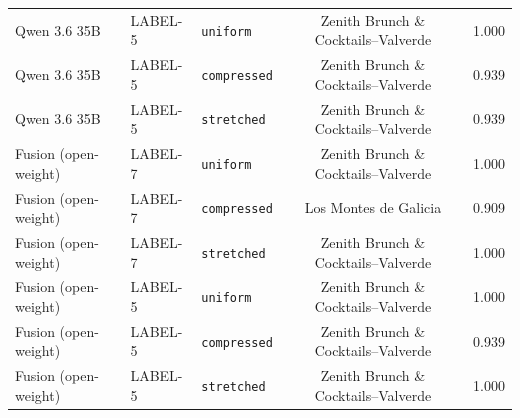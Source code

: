 \begin{table}[htbp]
{\begin{tabular}{lllcc}
  Qwen 3.6 35B & LABEL-5 & \texttt{uniform} & Zenith Brunch \& Cocktails--Valverde & 1.000 \\
  Qwen 3.6 35B & LABEL-5 & \texttt{compressed} & Zenith Brunch \& Cocktails--Valverde & 0.939 \\
  Qwen 3.6 35B & LABEL-5 & \texttt{stretched} & Zenith Brunch \& Cocktails--Valverde & 0.939 \\
  Fusion (open-weight) & LABEL-7 & \texttt{uniform} & Zenith Brunch \& Cocktails--Valverde & 1.000 \\
  Fusion (open-weight) & LABEL-7 & \texttt{compressed} & Los Montes de Galicia & 0.909 \\
  Fusion (open-weight) & LABEL-7 & \texttt{stretched} & Zenith Brunch \& Cocktails--Valverde & 1.000 \\
  Fusion (open-weight) & LABEL-5 & \texttt{uniform} & Zenith Brunch \& Cocktails--Valverde & 1.000 \\
  Fusion (open-weight) & LABEL-5 & \texttt{compressed} & Zenith Brunch \& Cocktails--Valverde & 0.939 \\
  Fusion (open-weight) & LABEL-5 & \texttt{stretched} & Zenith Brunch \& Cocktails--Valverde & 1.000 \\
\bottomrule
\end{tabular}%
}
\end{table}
